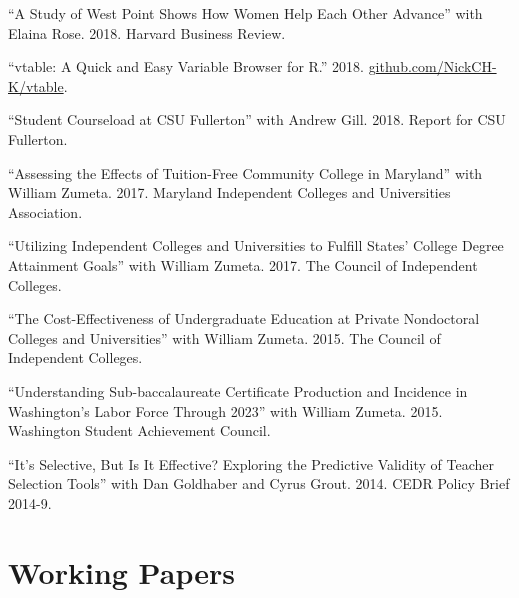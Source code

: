\documentclass[11pt,a4paper,sans]{moderncv}
\begin{document}
 \begin{hangparas}{.25in}{1} 
 ``A Study of West Point Shows How Women Help Each Other Advance'' with Elaina Rose. 2018. Harvard Business Review.



``vtable: A Quick and Easy Variable Browser for R.'' 2018. \href{https://www.github.com/NickCH-K/vtable}{github.com/NickCH-K/vtable}.



``Student Courseload at CSU Fullerton'' with Andrew Gill. 2018. Report for CSU Fullerton.



``Assessing the Effects of Tuition-Free Community College in Maryland'' with William Zumeta. 2017. Maryland Independent Colleges and Universities Association.



``Utilizing Independent Colleges and Universities to Fulfill States' College Degree Attainment Goals'' with William Zumeta. 2017. The Council of Independent Colleges.



``The Cost-Effectiveness of Undergraduate Education at Private Nondoctoral Colleges and Universities'' with William Zumeta. 2015. The Council of Independent Colleges.



``Understanding Sub-baccalaureate Certificate Production and Incidence in Washington's Labor Force Through 2023'' with William Zumeta. 2015. Washington Student Achievement Council.



``It's Selective, But Is It Effective? Exploring the Predictive Validity of Teacher Selection Tools'' with Dan Goldhaber and Cyrus Grout. 2014. CEDR Policy Brief 2014-9.

 
 \end{hangparas}


\section{Working Papers}  
  
\end{document}
